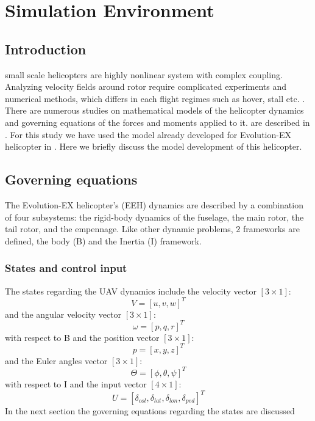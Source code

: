\chapter{Simulation Environment}
\section{Introduction}
small scale helicopters are highly nonlinear system with complex coupling. Analyzing velocity fields around rotor require complicated experiments and numerical methods, which differs in each flight regimes such as hover, stall etc. \cite{doerffer2008numerical,crittenden2004combustion,patterson1990computational}. There are numerous studies on mathematical models of the helicopter dynamics and governing equations of the forces and moments applied to it.
are described in \cite{padfield2008helicopter,marques2017advanced, seddon2011basic}. For this study we have used the model already developed for Evolution-EX helicopter in \cite{pourrezaei2014control}. Here we briefly discuss the model development of this helicopter.
\section{Governing equations}
The Evolution-EX helicopter's (EEH) dynamics are described by a combination of four subsystems: the rigid-body dynamics of the fuselage, the main rotor, the tail rotor, and the empennage. Like other dynamic problems, 2 frameworks are defined, the body (B) and the Inertia (I)  framework. 
\subsection{States and control input}
The states regarding the UAV dynamics include the velocity vector $[3\times1]$:
\begin{equation}
	V=[u,v,w]^T	
\end{equation}
and the angular velocity vector $[3\times1]$:
\begin{equation}
	\omega=[p,q,r]^T
\end{equation}
with respect to {B} and 
the position vector $[3\times1]$:
\begin{equation}
	p=[x,y,z]^T
\end{equation}
and the Euler angles vector $[3\times1]$:
\begin{equation}
	\Theta=[\phi,\theta,\psi]^T
\end{equation}
with respect to {I}
and the input vector $[4\times1]$:
\begin{equation}
	U=[\delta_{col},\delta_{lat},\delta_{lon},\delta_{ped}]^T
\end{equation} 
In the next section the governing equations regarding the states are discussed

